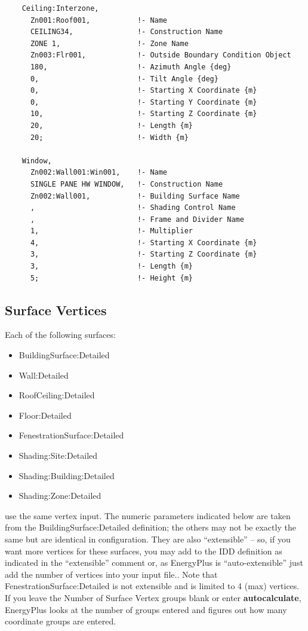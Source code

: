 \begin{lstlisting}
    Ceiling:Interzone,
      Zn001:Roof001,           !- Name
      CEILING34,               !- Construction Name
      ZONE 1,                  !- Zone Name
      Zn003:Flr001,            !- Outside Boundary Condition Object
      180,                     !- Azimuth Angle {deg}
      0,                       !- Tilt Angle {deg}
      0,                       !- Starting X Coordinate {m}
      0,                       !- Starting Y Coordinate {m}
      10,                      !- Starting Z Coordinate {m}
      20,                      !- Length {m}
      20;                      !- Width {m}

    Window,
      Zn002:Wall001:Win001,    !- Name
      SINGLE PANE HW WINDOW,   !- Construction Name
      Zn002:Wall001,           !- Building Surface Name
      ,                        !- Shading Control Name
      ,                        !- Frame and Divider Name
      1,                       !- Multiplier
      4,                       !- Starting X Coordinate {m}
      3,                       !- Starting Z Coordinate {m}
      3,                       !- Length {m}
      5;                       !- Height {m}
\end{lstlisting}

\subsection{Surface Vertices}\label{surface-vertices}

Each of the following surfaces:

\begin{itemize}
\item
  BuildingSurface:Detailed
\item
  Wall:Detailed
\item
  RoofCeiling:Detailed
\item
  Floor:Detailed
\item
  FenestrationSurface:Detailed
\item
  Shading:Site:Detailed
\item
  Shading:Building:Detailed
\item
  Shading:Zone:Detailed
\end{itemize}

use the same vertex input. The numeric parameters indicated below are taken from the BuildingSurface:Detailed definition; the others may not be exactly the same but are identical in configuration. They are also ``extensible'' -- so, if you want more vertices for these surfaces, you may add to the IDD definition as indicated in the ``extensible'' comment or, as EnergyPlus is ``auto-extensible'' just add the number of vertices into your input file.. Note that FenestrationSurface:Detailed is not extensible and is limited to 4 (max) vertices. If you leave the Number of Surface Vertex groups blank or enter \textbf{autocalculate}, EnergyPlus looks at the number of groups entered and figures out how many coordinate groups are entered.

